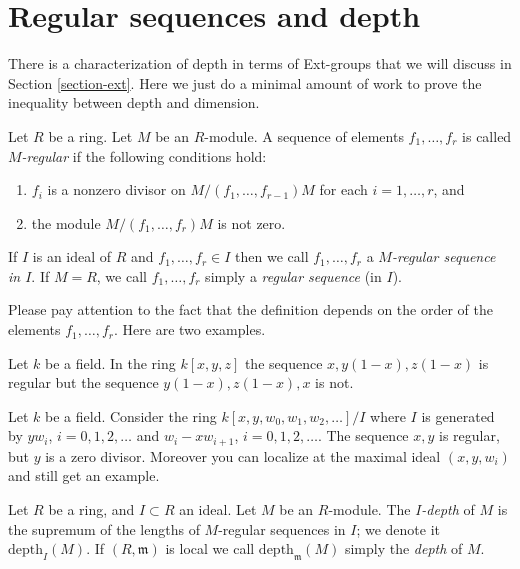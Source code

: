 \section{Regular sequences and depth}
\label{section-depth}

\noindent
There is a characterization of depth in terms of Ext-groups
that we will discuss in Section \ref{section-ext}. Here we just do
a minimal amount of work to prove the inequality between
depth and dimension.

\begin{definition}
\label{definition-regular-sequence}
Let $R$ be a ring.
Let $M$ be an $R$-module.
A sequence of elements $f_1, \ldots, f_r$ is called {\it $M$-regular}
if the following conditions hold:
\begin{enumerate}
\item $f_i$ is a nonzero divisor on
$M/(f_1, \ldots, f_{r-1})M$
for each $i = 1, \ldots, r$, and
\item the module $M/(f_1, \ldots, f_r)M$ is not zero.
\end{enumerate}
If $I$ is an ideal of $R$ and $f_1, \ldots, f_r \in I$
then we call $f_1, \ldots, f_r$ a {\it $M$-regular sequence
in $I$}. If $M = R$, we call $f_1, \ldots, f_r$ simply a
{\it regular sequence} (in $I$).
\end{definition}

\noindent
Please pay attention to the fact that the definition depends
on the order of the elements $f_1, \ldots, f_r$. Here are two
examples.

\begin{example}
\label{example-global-regular}
Let $k$ be a field. In the ring $k[x, y, z]$
the sequence $x, y(1-x), z(1-x)$ is regular
but the sequence $y(1-x), z(1-x), x$ is not.
\end{example}

\begin{example}
\label{example-local-regular}
Let $k$ be a field. Consider the ring
$k[x, y, w_0, w_1, w_2, \ldots]/I$
where $I$ is generated by $yw_i$, $i = 0, 1, 2, \ldots$ and
$w_i - xw_{i + 1}$, $i = 0, 1, 2, \ldots$.
The sequence $x, y$ is regular, but $y$ is a zero divisor.
Moreover you can localize at the maximal ideal
$(x, y, w_i)$ and still get an example.
\end{example}

\begin{definition}
\label{definition-depth}
Let $R$ be a ring, and $I \subset R$ an ideal.
Let $M$ be an $R$-module.
The {\it $I$-depth} of $M$ is the supremum of the lengths
of $M$-regular sequences in $I$; we denote it
$\text{depth}_I(M)$. If $(R, \mathfrak m)$ is
local we call $\text{depth}_{\mathfrak m}(M)$ simply
the {\it depth} of $M$.
\end{definition}

